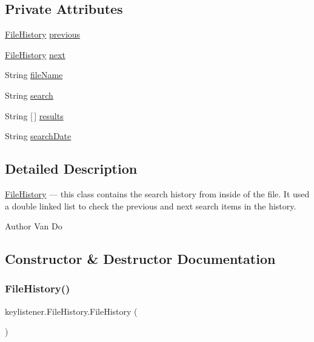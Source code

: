 \subsection*{Private Attributes}
\begin{DoxyCompactItemize}
\item 
\hyperlink{classkeylistener_1_1_file_history}{File\+History} \hyperlink{classkeylistener_1_1_file_history_ab08fec8e2a293a9000087d18e1454c44}{previous}
\item 
\hyperlink{classkeylistener_1_1_file_history}{File\+History} \hyperlink{classkeylistener_1_1_file_history_aa9571ba3eabdcc6b9e7d152a0a7537ee}{next}
\item 
String \hyperlink{classkeylistener_1_1_file_history_aa039d04ae73d6098a0d63f42dcf7a953}{file\+Name}
\item 
String \hyperlink{classkeylistener_1_1_file_history_a6370f7f80f43860c1da4962b9e0a3f01}{search}
\item 
String \mbox{[}$\,$\mbox{]} \hyperlink{classkeylistener_1_1_file_history_a665862b474b78805e841aaf23ab1123c}{results}
\item 
String \hyperlink{classkeylistener_1_1_file_history_aa05796c787baef3237827630d3284496}{search\+Date}
\end{DoxyCompactItemize}


\subsection{Detailed Description}
\hyperlink{classkeylistener_1_1_file_history}{File\+History} --- this class contains the search history from inside of the file. It used a double linked list to check the previous and next search items in the history. \begin{DoxyAuthor}{Author}
Van Do 
\end{DoxyAuthor}


\subsection{Constructor \& Destructor Documentation}
\mbox{\label{classkeylistener_1_1_file_history_a22f91ebaebdafb0076fc7ff28c3f1993}} 
\subsubsection{\texorpdfstring{File\+History()}{FileHistory()}\hspace{0.1cm}{\footnotesize\ttfamily [1/2]}}
{\footnotesize\ttfamily keylistener.\+File\+History.\+File\+History (\begin{DoxyParamCaption}{ }\end{DoxyParamCaption})\hspace{0.3cm}{\ttfamily [inline]}}

